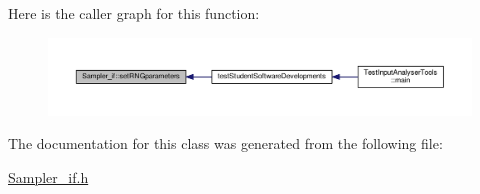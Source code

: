 Here is the caller graph for this function\-:
\nopagebreak
\begin{figure}[H]
\begin{center}
\leavevmode
\includegraphics[width=350pt]{class_sampler__if_a630a0cbbef6e49869063530b03d3bb35_icgraph}
\end{center}
\end{figure}




The documentation for this class was generated from the following file\-:\begin{DoxyCompactItemize}
\item 
\hyperlink{_sampler__if_8h}{Sampler\-\_\-if.\-h}\end{DoxyCompactItemize}

